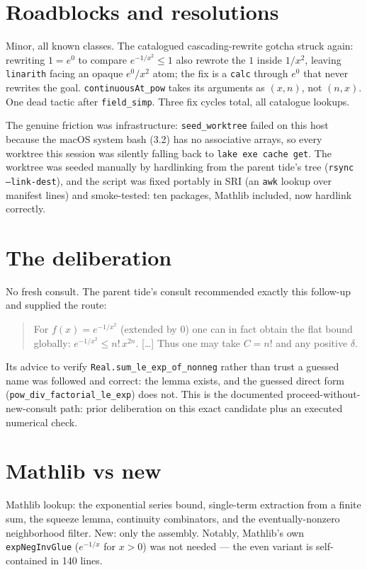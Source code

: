 \documentclass[11pt]{article}
\begin{document}
\section{Roadblocks and resolutions}

Minor, all known classes. The catalogued cascading-rewrite gotcha
struck again: rewriting $1 = e^0$ to compare $e^{-1/x^2} \le 1$ also
rewrote the $1$ inside $1/x^2$, leaving \texttt{linarith} facing an
opaque $e^0/x^2$ atom; the fix is a \texttt{calc} through
$e^0$ that never rewrites the goal. \texttt{continuousAt\_pow} takes
its arguments as $(x, n)$, not $(n, x)$. One dead tactic after
\texttt{field\_simp}. Three fix cycles total, all catalogue lookups.

The genuine friction was infrastructure: \texttt{seed\_worktree}
failed on this host because the macOS system bash (3.2) has no
associative arrays, so every worktree this session was silently
falling back to \texttt{lake exe cache get}. The worktree was seeded
manually by hardlinking from the parent tide's tree
(\texttt{rsync --link-dest}), and the script was fixed portably in
SRI (an \texttt{awk} lookup over manifest lines) and smoke-tested:
ten packages, Mathlib included, now hardlink correctly.

\section{The deliberation}

No fresh consult. The parent tide's consult recommended exactly this
follow-up and supplied the route:
\begin{quote}
For $f(x) = e^{-1/x^2}$ (extended by $0$) one can in fact obtain the
flat bound globally: $e^{-1/x^2} \le n!\,x^{2n}$. [\dots] Thus one may
take $C = n!$ and any positive $\delta$.
\end{quote}
Its advice to verify \texttt{Real.sum\_le\_exp\_of\_nonneg} rather
than trust a guessed name was followed and correct: the lemma exists,
and the guessed direct form (\texttt{pow\_div\_factorial\_le\_exp})
does not. This is the documented proceed-without-new-consult path:
prior deliberation on this exact candidate plus an executed numerical
check.

\section{Mathlib vs new}

Mathlib lookup: the exponential series bound, single-term extraction
from a finite sum, the squeeze lemma, continuity combinators, and the
eventually-nonzero neighborhood filter. New: only the assembly. Notably,
Mathlib's own \texttt{expNegInvGlue} ($e^{-1/x}$ for $x > 0$) was not
needed --- the even variant is self-contained in 140 lines.
\end{document}
